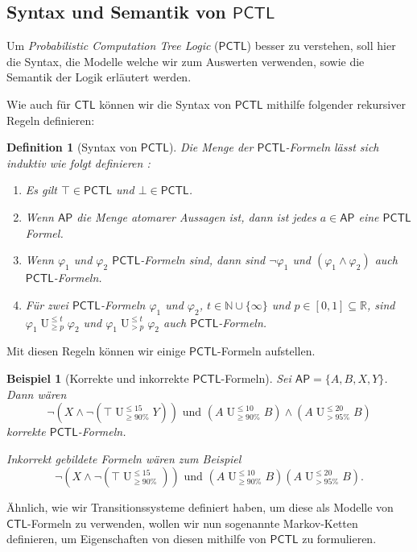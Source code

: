 \documentclass{lni}
\theoremstyle{def_style}
\newtheorem{definition}{Definition}[section]
\theoremstyle{break}
\newtheorem{example}{Beispiel}
\newcommand{\UEqual}[4]{#1\operatorname{U}^{\leq #2}_{\geq #3}#4}
\newcommand{\UStrict}[4]{#1\operatorname{U}^{\leq #2}_{> #3}#4}
\newcommand{\CTL}{\mathsf{CTL}}
\newcommand{\PCTL}{\mathsf{PCTL}}
\begin{document}
\subsection{Syntax und Semantik von $\PCTL$}

Um \textit{Probabilistic Computation Tree Logic} ($\PCTL$) besser zu verstehen, soll hier die Syntax, die Modelle welche wir zum Auswerten verwenden, sowie die Semantik der Logik erläutert werden.

Wie auch für $\CTL$ können wir die Syntax von  $\PCTL$ mithilfe folgender rekursiver Regeln definieren:
\begin{definition}[Syntax von $\PCTL$]
	\label{SyntaxPCTL}
	Die Menge der $\PCTL$-Formeln lässt sich induktiv wie folgt definieren \cite{hansson1994logic}:
	\begin{enumerate}
		\item Es gilt $\top\in \PCTL$ und $\bot\in \PCTL$.
		\item Wenn $\mathsf{AP}$ die Menge atomarer Aussagen ist, dann ist jedes $a\in \mathsf{AP}$ eine $\PCTL$ Formel.
		\item Wenn $\varphi_1$ und $\varphi_2$ $\PCTL$-Formeln sind, dann sind $\neg\varphi_1$ und $(\varphi_1\land \varphi_2)$ auch $\PCTL$-Formeln.
		\item Für zwei $\PCTL$-Formeln $\varphi_1$ und $\varphi_2$, $t\in \mathbb{N}\cup\{\infty\}$ und $p\in [0,1]\subseteq\mathbb{R}$, sind $\UEqual{\varphi_1}{t}{p}{\varphi_2}$ und $\UStrict{\varphi_1}{t}{p}{\varphi_2}$ auch $\PCTL$-Formeln.
	\end{enumerate}
\end{definition}
Mit diesen Regeln können wir einige $\PCTL$-Formeln aufstellen.
\begin{example}[Korrekte und inkorrekte $\PCTL$-Formeln]
	Sei $\mathsf{AP}=\{A,B,X,Y\}$. Dann wären 
	$$\neg(X \land \neg(\UEqual{\top}{15}{90\%}{Y})) \text{ und } (\UEqual{A}{10}{90\%}{B}) \land (\UStrict{A}{20}{95\%}{B})$$ 
	korrekte $\PCTL$-Formeln.
	
	Inkorrekt gebildete Formeln wären zum Beispiel $$\neg(X \land \neg(\UEqual{\top}{15}{90\%}{})) \text{ und } (\UEqual{A}{10}{90\%}{B})(\UStrict{A}{20}{95\%}{B}).$$
\end{example}

Ähnlich, wie wir Transitionssysteme definiert haben, um diese als Modelle von $\CTL$-Formeln zu verwenden, wollen wir nun sogenannte Markov-Ketten definieren, um Eigenschaften von diesen mithilfe von $\PCTL$ zu formulieren.
\end{document}

